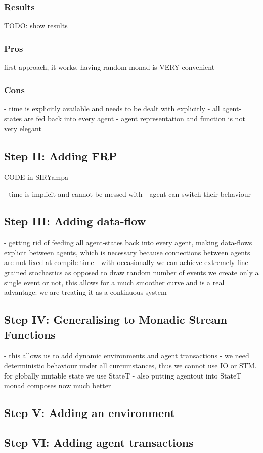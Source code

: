\subsubsection{Results}
TODO: show results

\subsubsection{Pros}
first approach, it works, having random-monad is VERY convenient

\subsubsection{Cons}
- time is explicitly available and needs to be dealt with explicitly
- all agent-states are fed back into every agent
- agent representation and function is not very elegant 

\subsection{Step II: Adding FRP}
CODE in SIRYampa

- time is implicit and cannot be messed with
- agent can switch their behaviour

\subsection{Step III: Adding data-flow}
- getting rid of feeding all agent-states back into every agent, making data-flows explicit between agents, which is necessary because connections between agents are not fixed at compile time
- with occasionally we can achieve extremely fine grained stochastics as opposed to draw random number of events we create only a single event or not, this allows for a much smoother curve and is a real advantage: we are treating it as a continuous system

\subsection{Step IV: Generalising to Monadic Stream Functions}
- this allows us to add dynamic environments and agent transactions
- we need deterministic behaviour under all curcumstances, thus we cannot use IO or STM. for globally mutable state we use StateT
- also putting agentout into StateT monad composes now much better

\subsection{Step V: Adding an environment}

\subsection{Step VI: Adding agent transactions}
